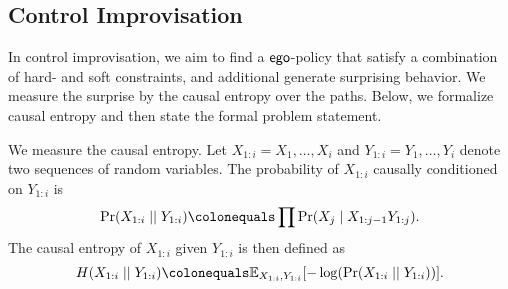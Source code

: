 {{{

\begin{example}
	
\end{example}



\subsection{Control Improvisation}
In control improvisation, we aim to find a $\mathsf{ego}$-policy that satisfy a combination of hard- and soft constraints, and additional generate surprising behavior. 
We measure the surprise by the causal entropy over the paths. Below, we formalize causal entropy and then state the formal problem statement. 

We measure the causal entropy. Let $X_{1:i} = X_1, \hdots, X_i$ and $Y_{1:i} = Y_1,\hdots,Y_i$ denote two sequences of random variables. The probability of $ X_{1:i}$ causally conditioned on $Y_{1:i}$ is 
\[ \causalprob{X_{1:i}}{Y_{1:i}} \colonequals \prod \Pr(X_j \mid X_{1:j-1}Y_{1:j}). \]
The causal entropy of $X_{1:i}$ given $Y_{1:i}$ is then defined as 
\[  H(X_{1:i}\mid\mid Y_{1:i}) \colonequals \expOver{X_{1:i},Y_{1:i}}{-\log(\causalprob{X_{1:i}}{Y_{1:i}})}.\] 

}}}
